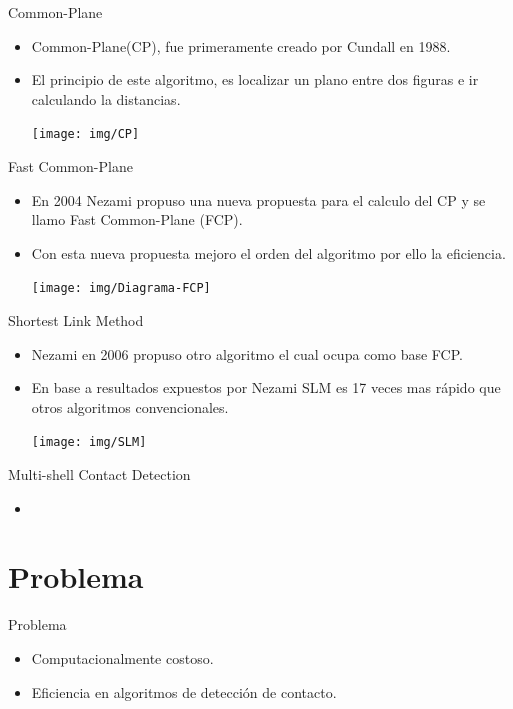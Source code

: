 \documentclass[11pt]{beamer}
\begin{document}
\begin{frame}{Common-Plane}
 \begin{itemize}
  \item Common-Plane(CP), fue primeramente creado por Cundall en 1988.
  \item El principio de este algoritmo, es localizar un plano entre dos figuras e ir calculando la distancias.
  
  \texttt{[image: img/CP]}
 \end{itemize}
\end{frame}

\begin{frame}{Fast Common-Plane}
 \begin{itemize}
  \item En 2004 Nezami \cite{2004-Nezami} propuso una nueva propuesta para el calculo del CP y se llamo Fast Common-Plane (FCP).
  \item Con esta nueva propuesta mejoro el orden del algoritmo por ello la eficiencia.
  
  \texttt{[image: img/Diagrama-FCP]}
 \end{itemize}
\end{frame}

\begin{frame}{Shortest Link Method}
 \begin{itemize}
  \item Nezami en 2006 \cite{2006-Nezami} propuso otro algoritmo el cual ocupa como base FCP.
  \item En base a resultados expuestos por Nezami \cite{2006-Nezami} SLM es 17 veces mas rápido que otros algoritmos convencionales.
  
  \texttt{[image: img/SLM]}
 \end{itemize}
\end{frame}

\begin{frame}{Multi-shell Contact Detection}
 \begin{itemize}
  \item %
 \end{itemize}
\end{frame}

\section{Problema}
\begin{frame}{Problema}
\begin{itemize}
    \item Computacionalmente costoso.
    \item Eficiencia en algoritmos de detección de contacto.
\end{itemize}
\end{frame}
\end{document}
